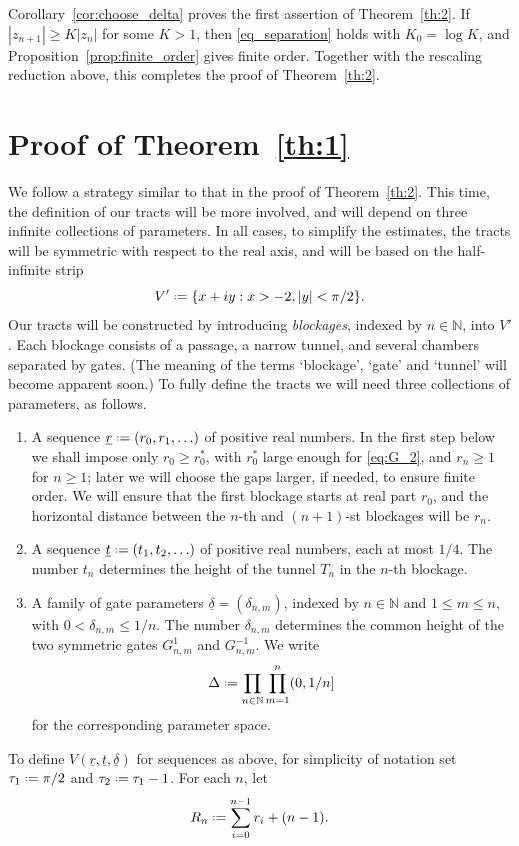 \documentclass[a4paper, 11pt, reqno]{amsart}
\numberwithin{equation}{section}
\theoremstyle{plain}
\newcommand*{\defeq}{\mathrel{\vcenter{\baselineskip0.5ex \lineskiplimit0pt
 \hbox{\scriptsize.}\hbox{\scriptsize.}}}=}
\theoremstyle{remark}
\newcommand{\N}{{\mathbb{N}}}
\newcommand{\uldelta}{\underline{\delta}}
\newcommand{\ulr}{\underline{r}}
\newcommand{\ult}{\underline{t}}
\begin{document}
Corollary~\ref{cor:choose_delta} proves the first assertion of Theorem~\ref{th:2}. If \(|z_{n+1}|\geq K|z_n|\) for some \(K>1\), then \eqref{eq_separation} holds with \(K_0=\log K\), and Proposition~\ref{prop:finite_order} gives finite order. Together with the rescaling reduction above, this completes the proof of Theorem~\ref{th:2}.

\section{Proof of Theorem~\ref{th:1}}
\label{S.th1}

We follow a strategy similar to that in the proof of Theorem~\ref{th:2}. This time, the definition of our tracts will be more involved, and will depend on three infinite collections of parameters. In all cases, to simplify the estimates, the tracts will be symmetric with respect to the real axis, and will be based on the half-infinite strip
\[
V' \defeq \{ x + iy : x > -2, |y| < \pi/2 \}.
\]
Our tracts will be constructed by introducing \textit{blockages}, indexed by $n\in \N$, into $V'$. Each blockage consists of a passage, a narrow tunnel, and several chambers separated by gates. (The meaning of the terms `blockage', `gate' and `tunnel' will become apparent soon.) To fully define the tracts we will need three collections of parameters, as follows.

\begin{enumerate}
	\item A sequence \(\ulr\defeq(r_0,r_1,\ldots)\) of positive real numbers. In the first step below we shall impose only \(r_0\ge r_0^*\), with \(r_0^*\) large enough for \eqref{eq:G_2}, and \(r_n\ge1\) for \(n\ge1\); later we will choose the gaps larger, if needed, to ensure finite order. We will ensure that the first blockage starts at real part \(r_0\), and the horizontal distance between the \(n\)-th and \((n+1)\)-st blockages will be \(r_n\).
	\item A sequence \(\ult\defeq(t_1,t_2,\ldots)\) of positive real numbers, each at most \(1/4\). The number \(t_n\) determines the height of the tunnel \(T_n\) in the \(n\)-th blockage.
	\item A family of gate parameters \(\uldelta=(\delta_{n,m})\), indexed by
	\(n\in\N\) and \(1\le m\le n\), with \(0<\delta_{n,m}\le 1/n\). The number
	\(\delta_{n,m}\) determines the common height of the two symmetric gates
	\(G^1_{n,m}\) and \(G^{-1}_{n,m}\). We write
	\[
	\Delta\defeq \prod_{n\in\N}\prod_{m=1}^n (0,1/n]
	\]
	for the corresponding parameter space.
\end{enumerate}
To define $V(\ulr, \ult, \uldelta)$ for sequences as above, for simplicity of notation set $\tau_1 \defeq \pi/2$ and $\tau_2 \defeq \tau_1 - 1$. For each $n$,
let 
$$ R_n \defeq \sum_{i=0}^{n-1} r_i + (n-1).$$
\end{document}
